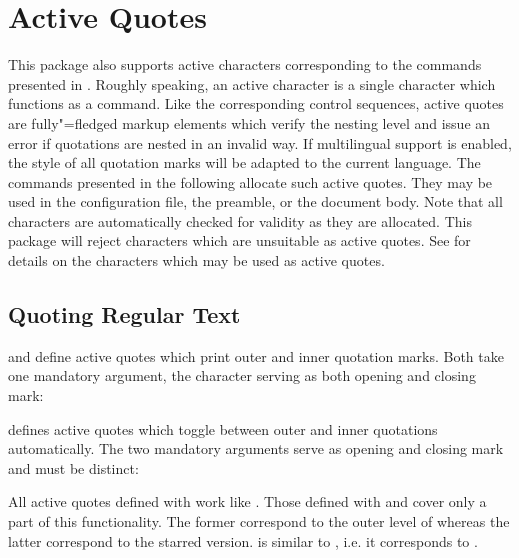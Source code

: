 \documentclass{ltxdockit}[2010/09/26]
\begin{document}
\section{Active Quotes}
\label{act}

This package also supports active characters corresponding to the commands presented in . Roughly speaking, an active character is a single character which functions as a command. Like the corresponding control sequences, active quotes are fully"=fledged markup elements which verify the nesting level and issue an error if quotations are nested in an invalid way. If multilingual support is enabled, the style of all quotation marks will be adapted to the current language. The commands presented in the following allocate such active quotes. They may be used in the configuration file, the preamble, or the document body. Note that all characters are automatically checked for validity as they are allocated. This package will reject characters which are unsuitable as active quotes. See  for details on the characters which may be used as active quotes.

\subsection{Quoting Regular Text}
\label{act:reg}

 and  define active quotes which print outer and inner quotation marks. Both take one mandatory argument, the character serving as both opening and closing mark:

\begin{ltxsyntax}


 defines active quotes which toggle between outer and inner quotations automatically. The two mandatory arguments serve as opening and closing mark and must be distinct:


All active quotes defined with  work like . Those defined with  and  cover only a part of this functionality. The former correspond to the outer level of  whereas the latter correspond to the starred version.  is similar to , i.e. it corresponds to .

\end{ltxsyntax}
\end{document}
